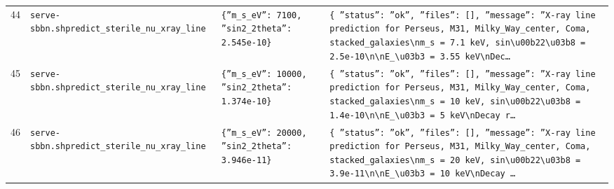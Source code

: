 \documentclass[11pt,a4paper]{article}
\begin{document}
\begin{longtable}{@{}p{}p{}p{}p{}@{}}
44 & \texttt{serve-sbbn.sh}\newline\texttt{predict\_\allowbreak{}sterile\_\allowbreak{}nu\_\allowbreak{}xray\_\allowbreak{}line} & \texttt{\{''m\_\allowbreak{}s\_\allowbreak{}eV'':\allowbreak{} 7100,\allowbreak{} ''sin2\_\allowbreak{}2theta'':\allowbreak{} 2.545e-10\}\allowbreak{}} & \texttt{\{   ''status'':\allowbreak{} ''ok'',\allowbreak{}   ''files'':\allowbreak{} []\allowbreak{},\allowbreak{}   ''message'':\allowbreak{} ''X-ray line prediction for Perseus,\allowbreak{} M31,\allowbreak{} Milky\_\allowbreak{}Way\_\allowbreak{}center,\allowbreak{} Coma,\allowbreak{} stacked\_\allowbreak{}galaxies\textbackslash{}\allowbreak{}nm\_\allowbreak{}s =\allowbreak{} 7.1 keV,\allowbreak{} sin\textbackslash{}\allowbreak{}u00b22\textbackslash{}\allowbreak{}u03b8 =\allowbreak{} 2.5e-10\textbackslash{}\allowbreak{}n\textbackslash{}\allowbreak{}nE\_\allowbreak{}\textbackslash{}\allowbreak{}u03b3 =\allowbreak{} 3.55 keV\textbackslash{}\allowbreak{}nDec\ldots{}\allowbreak{}} \\
45 & \texttt{serve-sbbn.sh}\newline\texttt{predict\_\allowbreak{}sterile\_\allowbreak{}nu\_\allowbreak{}xray\_\allowbreak{}line} & \texttt{\{''m\_\allowbreak{}s\_\allowbreak{}eV'':\allowbreak{} 10000,\allowbreak{} ''sin2\_\allowbreak{}2theta'':\allowbreak{} 1.374e-10\}\allowbreak{}} & \texttt{\{   ''status'':\allowbreak{} ''ok'',\allowbreak{}   ''files'':\allowbreak{} []\allowbreak{},\allowbreak{}   ''message'':\allowbreak{} ''X-ray line prediction for Perseus,\allowbreak{} M31,\allowbreak{} Milky\_\allowbreak{}Way\_\allowbreak{}center,\allowbreak{} Coma,\allowbreak{} stacked\_\allowbreak{}galaxies\textbackslash{}\allowbreak{}nm\_\allowbreak{}s =\allowbreak{} 10 keV,\allowbreak{} sin\textbackslash{}\allowbreak{}u00b22\textbackslash{}\allowbreak{}u03b8 =\allowbreak{} 1.4e-10\textbackslash{}\allowbreak{}n\textbackslash{}\allowbreak{}nE\_\allowbreak{}\textbackslash{}\allowbreak{}u03b3 =\allowbreak{} 5 keV\textbackslash{}\allowbreak{}nDecay r\ldots{}\allowbreak{}} \\
46 & \texttt{serve-sbbn.sh}\newline\texttt{predict\_\allowbreak{}sterile\_\allowbreak{}nu\_\allowbreak{}xray\_\allowbreak{}line} & \texttt{\{''m\_\allowbreak{}s\_\allowbreak{}eV'':\allowbreak{} 20000,\allowbreak{} ''sin2\_\allowbreak{}2theta'':\allowbreak{} 3.946e-11\}\allowbreak{}} & \texttt{\{   ''status'':\allowbreak{} ''ok'',\allowbreak{}   ''files'':\allowbreak{} []\allowbreak{},\allowbreak{}   ''message'':\allowbreak{} ''X-ray line prediction for Perseus,\allowbreak{} M31,\allowbreak{} Milky\_\allowbreak{}Way\_\allowbreak{}center,\allowbreak{} Coma,\allowbreak{} stacked\_\allowbreak{}galaxies\textbackslash{}\allowbreak{}nm\_\allowbreak{}s =\allowbreak{} 20 keV,\allowbreak{} sin\textbackslash{}\allowbreak{}u00b22\textbackslash{}\allowbreak{}u03b8 =\allowbreak{} 3.9e-11\textbackslash{}\allowbreak{}n\textbackslash{}\allowbreak{}nE\_\allowbreak{}\textbackslash{}\allowbreak{}u03b3 =\allowbreak{} 10 keV\textbackslash{}\allowbreak{}nDecay \ldots{}\allowbreak{}} \\

\end{longtable}
\end{document}
